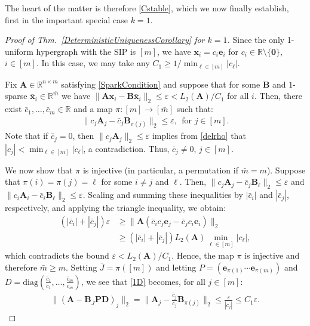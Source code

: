 \documentclass[9pt,twocolumn]{pnas-new}
\begin{document}
The heart of the matter is therefore \eqref{Cstable}, which we now finally establish, first in the important special case $k = 1$.

\begin{proof}[Proof of Thm.~\ref{DeterministicUniquenessCorollary} for $k=1$]
Since the only 1-uniform hypergraph with the SIP is $[m]$, we have $\mathbf{x}_i = c_i \mathbf{e}_i$ for $c_i \in \mathbb{R} \setminus \{\mathbf{0}\}$, $i \in [m]$. In this case, we may take any $C_1 \geq 1/ \min_{\ell \in [m]} |c_{\ell}|$. 

Fix $\mathbf{A} \in \mathbb{R}^{n \times m}$ satisfying \eqref{SparkCondition} and suppose that for some $\mathbf{B}$ and $1$-sparse $\mathbf{\bar x}_i \in \mathbb{R}^{\bar m}$ we have  $\|\mathbf{A}\mathbf{x}_i - \mathbf{B}\mathbf{\bar x}_i\|_2 \leq \varepsilon < L_2(\mathbf{A}) / C_1$ for all $i$. Then, there exist $\bar{c}_1, \ldots, \bar{c}_m \in \mathbb{R}$ and a map $\pi: [m] \to [\bar m]$ such that:
\begin{align}\label{1D}
\|c_j\mathbf{A}_j - \bar{c}_j\mathbf{B}_{\pi(j)}\|_2 \leq \varepsilon,\ \ \text{for $j \in [m]$}.
\end{align} 
Note that if $\bar{c}_j = 0$, then $\|c_j\mathbf{A}_j \|_2 \leq \varepsilon$ implies from \eqref{delrho} that $|c_j| < \min_{\ell \in [m]} | c_\ell |$, a contradiction.  Thus, $\bar{c}_j \neq 0$, $j \in [m]$.

We  now show that $\pi$ is injective (in particular, a permutation if $\bar m = m$). Suppose that $\pi(i) = \pi(j) = \ell$ for some $i \neq j$ and $\ell$. Then, $\|c_{j}\mathbf{A}_{j} - \bar{c}_{j}\mathbf{B}_{\ell}\|_2 \leq \varepsilon$ and $\|c_{i}\mathbf{A}_{i} - \bar{c}_{i} \mathbf{B}_{\ell}\|_2  \leq \varepsilon$. Scaling and summing these inequalities by $|\bar{c}_{i}|$ and $|\bar{c}_{j}|$, respectively, and applying the triangle inequality, we obtain:
\begin{align*}
(|\bar{c}_{i}| + |\bar{c}_{j}|) \varepsilon
&\geq\|\mathbf{A}(\bar{c}_{i}c_{j} \mathbf{e}_{j} - \bar{c}_{j}c_{i}\mathbf{e}_{i})\|_2 \nonumber \\ 
&\geq  \left( |\bar{c}_{i}| + |\bar{c}_{j}| \right) L_2(\mathbf{A}) \min_{\ell \in [m]} |c_\ell |,
\end{align*}
which contradicts the bound $\varepsilon < L_2(\mathbf{A})/C_1$. Hence, the map $\pi$ is injective and therefore $\bar m \geq m$. Setting $\bar J = \pi([m])$ and letting $P = \left( \mathbf{e}_{\pi(1)} \cdots \mathbf{e}_{\pi(m)}\right)$ and $D = \text{diag}(\frac{\bar{c}_1}{c_1},\ldots,\frac{\bar{c}_m}{c_m})$, we see that \eqref{1D} becomes, for all $j \in [m]$:
\begin{align*}
\|(\mathbf{A} - \mathbf{B}_{\bar J}\mathbf{PD})_j\|_2 
= \|\mathbf{A}_j - \frac{\bar{c}_j}{c_j}\mathbf{B}_{\pi(j)}\|_2 
\leq \frac{\varepsilon}{|c_j|} 
\leq C_1\varepsilon.
\end{align*}
\end{proof}
\end{document}
